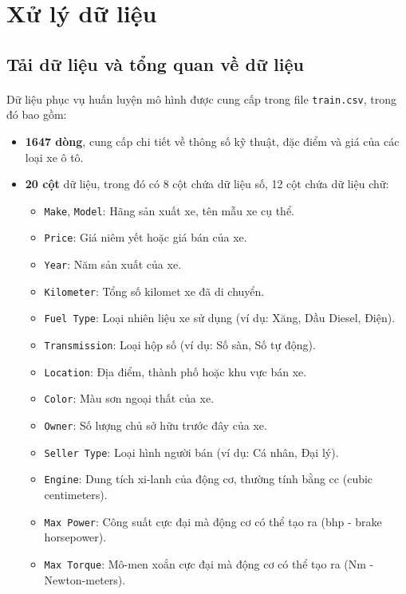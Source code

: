 \newpage
\section{Xử lý dữ liệu}

\subsection{Tải dữ liệu và tổng quan về dữ liệu} 
\paragraph{}{Dữ liệu phục vụ huấn luyện mô hình được cung cấp trong file \texttt{train.csv}, trong đó bao gồm:}
\begin{itemize}
    \item \textbf{1647 dòng}, cung cấp chi tiết về thông số kỹ thuật, đặc điểm và giá của các loại xe ô tô.
    \item \textbf{20 cột} dữ liệu, trong đó có 8 cột chứa dữ liệu số, 12 cột chứa dữ liệu chữ: 
    \begin{itemize}
        \item \texttt{Make}, \texttt{Model}: Hãng sản xuất xe, tên mẫu xe cụ thể.
        \item \texttt{Price}: Giá niêm yết hoặc giá bán của xe.
        \item \texttt{Year}: Năm sản xuất của xe.
        \item \texttt{Kilometer}: Tổng số kilomet xe đã di chuyển.
        \item \texttt{Fuel Type}: Loại nhiên liệu xe sử dụng (ví dụ: Xăng, Dầu Diesel, Điện).
        \item \texttt{Transmission}: Loại hộp số (ví dụ: Số sàn, Số tự động).
        \item \texttt{Location}: Địa điểm, thành phố hoặc khu vực bán xe.
        \item \texttt{Color}: Màu sơn ngoại thất của xe.
        \item \texttt{Owner}: Số lượng chủ sở hữu trước đây của xe.
        \item \texttt{Seller Type}: Loại hình người bán (ví dụ: Cá nhân, Đại lý).
        \item \texttt{Engine}: Dung tích xi-lanh của động cơ, thường tính bằng cc (cubic centimeters).
        \item \texttt{Max Power}: Công suất cực đại mà động cơ có thể tạo ra (bhp - brake horsepower).
        \item \texttt{Max Torque}: Mô-men xoắn cực đại mà động cơ có thể tạo ra (Nm - Newton-meters).

\end{itemize}
\end{itemize}
